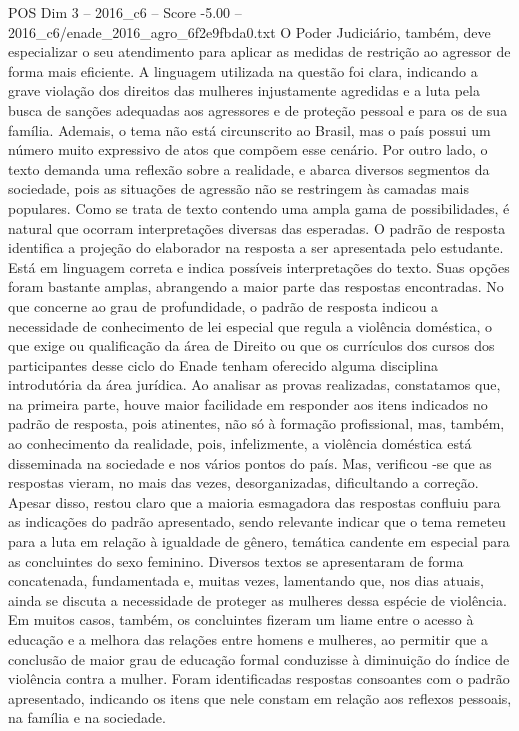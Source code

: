 \begin{textsample}{POS Dim 3 – 2016\_c6 – Score -5.00 – 2016\_c6/enade\_2016\_agro\_6f2e9fbda0.txt}
O Poder Judiciário, também, deve especializar o seu atendimento para aplicar as medidas de restrição ao agressor de forma mais eficiente.
A linguagem utilizada na questão foi clara, indicando a grave violação dos direitos das mulheres injustamente agredidas e a luta pela busca de sanções adequadas aos agressores e de proteção pessoal e para os de sua família.
Ademais, o tema não está circunscrito ao Brasil, mas o país possui um número muito expressivo de atos que compõem esse cenário.
Por outro lado, o texto demanda uma reflexão sobre a realidade, e abarca diversos segmentos da sociedade, pois as situações de agressão não se restringem às camadas mais populares.
Como se trata de texto contendo uma ampla gama de possibilidades, é natural que ocorram interpretações diversas das esperadas.
O padrão de resposta identifica a projeção do elaborador na resposta a ser apresentada pelo estudante.
Está em linguagem correta e indica possíveis interpretações do texto.
Suas opções foram bastante amplas, abrangendo a maior parte das respostas encontradas.
No que concerne ao grau de profundidade, o padrão de resposta indicou a necessidade de conhecimento de lei especial que regula a violência doméstica, o que exige ou qualificação da área de Direito ou que os currículos dos cursos dos participantes desse ciclo do Enade tenham oferecido alguma disciplina introdutória da área jurídica.
Ao analisar as provas realizadas, constatamos que, na primeira parte, houve maior facilidade em responder aos itens indicados no padrão de resposta, pois atinentes, não só à formação profissional, mas, também, ao conhecimento da realidade, pois, infelizmente, a violência doméstica está disseminada na sociedade e nos vários pontos do país.
Mas, verificou -se que as respostas vieram, no mais das vezes, desorganizadas, dificultando a correção.
Apesar disso, restou claro que a maioria esmagadora das respostas confluiu para as indicações do padrão apresentado, sendo relevante indicar que o tema remeteu para a luta em relação à igualdade de gênero, temática candente em especial para as concluintes do sexo feminino.
Diversos textos se apresentaram de forma concatenada, fundamentada e, muitas vezes, lamentando que, nos dias atuais, ainda se discuta a necessidade de proteger as mulheres dessa espécie de violência.
Em muitos casos, também, os concluintes fizeram um liame entre o acesso à educação e a melhora das relações entre homens e mulheres, ao permitir que a conclusão de maior grau de educação formal conduzisse à diminuição do índice de violência contra a mulher.
Foram identificadas respostas consoantes com o padrão apresentado, indicando os itens que nele constam em relação aos reflexos pessoais, na família e na sociedade.

\end{textsample}
